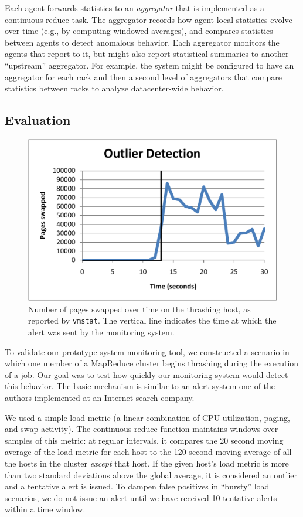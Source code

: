 Each agent forwards statistics to an \emph{aggregator} that is implemented as a
continuous reduce task. The aggregator records how agent-local statistics evolve
over time (e.g., by computing windowed-averages), and compares statistics
between agents to detect anomalous behavior. Each aggregator monitors the agents
that report to it, but might also report statistical summaries to another
``upstream'' aggregator. For example, the system might be configured to have an
aggregator for each rack and then a second level of aggregators that compare
statistics between racks to analyze datacenter-wide behavior.

\subsection{Evaluation}
\begin{figure}[t]
  \centering
  \includegraphics[width=0.95\linewidth]{figures/continue.pdf}
  \caption{Number of pages swapped over time on the thrashing host, as reported
    by \texttt{vmstat}.  The vertical line indicates the time at which the alert
    was sent by the monitoring system.}
\label{fig:outlier}
\end{figure}

To validate our prototype system monitoring tool, we constructed a
scenario in which one member of a MapReduce cluster begins thrashing
during the execution of a job. Our goal was to test how quickly our
monitoring system would detect this behavior. The basic mechanism is
similar to an alert system one of the authors implemented at an
Internet search company.

We used a simple load metric (a linear combination of CPU utilization,
paging, and swap activity). The continuous reduce function maintains
windows over samples of this metric: at regular intervals, it
compares the 20 second moving average of the load metric for each host
to the 120 second moving average of all the hosts in the cluster
\emph{except} that host.  If the given host's load metric is more
than two standard deviations above the global average, it is
considered an outlier and a tentative alert is issued.  To dampen
false positives in ``bursty'' load scenarios, we do not issue an alert
until we have received 10 tentative alerts within a time window.

